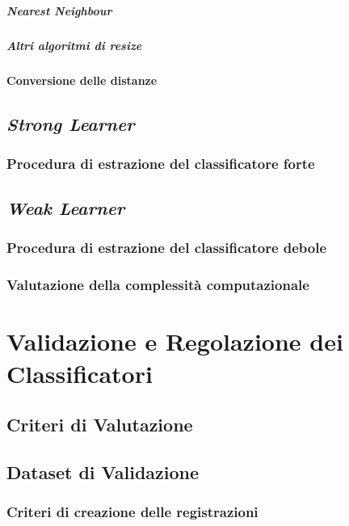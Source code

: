                 \paragraph{Nearest Neighbour}
                \paragraph{Altri algoritmi di resize}
            \subsubsection{Conversione delle distanze}
    \section{\emph{Strong Learner}}
    \label{sec:strong_learner}
        \subsection{Procedura di estrazione del classificatore forte}
    \section{\emph{Weak Learner}}
    \label{sec:weak_learner}
        \subsection{Procedura di estrazione del classificatore debole}
        \subsection{Valutazione della complessità computazionale}

\chapter{Validazione e Regolazione dei Classificatori}
\label{chap:tuning}
    \section{Criteri di Valutazione}
    \label{sec:evaluation_criteria}
    \section{Dataset di Validazione}
    \label{sec:validation_dataset}
        \subsection{Criteri di creazione delle registrazioni}
